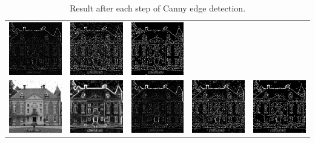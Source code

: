 \documentclass[12pt,a4paper,notitlepage,oneside,amsmath,amssymb]{article}
\begin{document}
\begin{CJK*}{UTF8}{bkai}
\begin{enumerate}[label=(\alph*)]
\begin{table}
\begin{tabular}[h!]{ccccc}
\includegraphics[width=.18\linewidth]{E3_sample2_suppression}&
\includegraphics[width=.18\linewidth]{E3_sample2_thresholding}&
\includegraphics[width=.18\linewidth]{E3_sample2}\\
\includegraphics[width=.18\linewidth]{sample3}&
\includegraphics[width=.18\linewidth]{E3_sample3_gradient}&
\includegraphics[width=.18\linewidth]{E3_sample3_suppression}&
\includegraphics[width=.18\linewidth]{E3_sample3_thresholding}&
\includegraphics[width=.18\linewidth]{E3_sample3}\\
\end{tabular}
\caption{Result after each step of Canny edge detection.}
\end{table}


\end{enumerate}
\end{CJK*}
\end{document}
